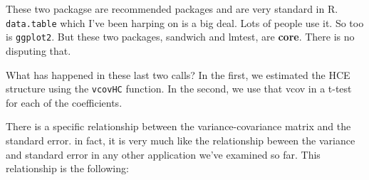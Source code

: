 \documentclass[
]{article}
\newenvironment{Shaded}{\begin{snugshade}}{\end{snugshade}}
\newcommand{\AttributeTok}[1]{\textcolor[rgb]{0.77,0.63,0.00}{#1}}
\newcommand{\CommentTok}[1]{\textcolor[rgb]{0.56,0.35,0.01}{\textit{#1}}}
\newcommand{\DocumentationTok}[1]{\textcolor[rgb]{0.56,0.35,0.01}{\textbf{\textit{#1}}}}
\newcommand{\FunctionTok}[1]{\textcolor[rgb]{0.00,0.00,0.00}{#1}}
\newcommand{\NormalTok}[1]{#1}
\newcommand{\OtherTok}[1]{\textcolor[rgb]{0.56,0.35,0.01}{#1}}
\newcommand{\SpecialCharTok}[1]{\textcolor[rgb]{0.00,0.00,0.00}{#1}}
\newcommand{\StringTok}[1]{\textcolor[rgb]{0.31,0.60,0.02}{#1}}
\begin{document}
\begin{Shaded}
\end{Shaded}

These two packagse are recommended packages and are very standard in R. \texttt{data.table} which I've been harping on is a big deal. Lots of people use it. So too is \texttt{ggplot2}. But these two packages, sandwich and lmtest, are \textbf{core}. There is no disputing that.

\begin{Shaded}
\end{Shaded}

What has happened in these last two calls? In the first, we estimated the HCE structure using the \texttt{vcovHC} function. In the second, we use that vcov in a t-test for each of the coefficients.

There is a specific relationship between the variance-covariance matrix and the standard error. in fact, it is very much like the relationship beween the variance and standard error in any other application we've examined so far. This relationship is the following:
\end{document}
